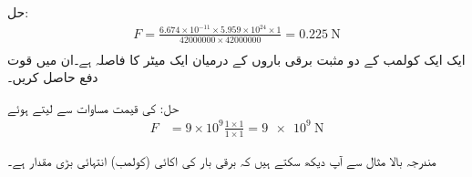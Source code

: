 حل: 
\begin{align*}
F=\frac{6.674 \times 10^{-11} \times 5.959 \times 10^{24} \times 1}{\num{42000000} \times \num{42000000}}=\SI{0.225}{\newton}\\
\end{align*}
ایک ایک کولمب کے دو مثبت برقی باروں کے درمیان  ایک میٹر کا فاصلہ ہے۔ان میں قوت دفع حاصل کریں۔

حل:  کی قیمت مساوات  سے لیتے ہوئے
\begin{align*}
F&=9 \times 10^9 \frac{1 \times 1}{1 \times 1}=\SI{9e9}{\newton}
\end{align*}

مندرجہ بالا مثال سے  آپ دیکھ سکتے ہیں کہ برقی بار کی اکائی (کولمب)  انتہائی بڑی مقدار ہے۔

